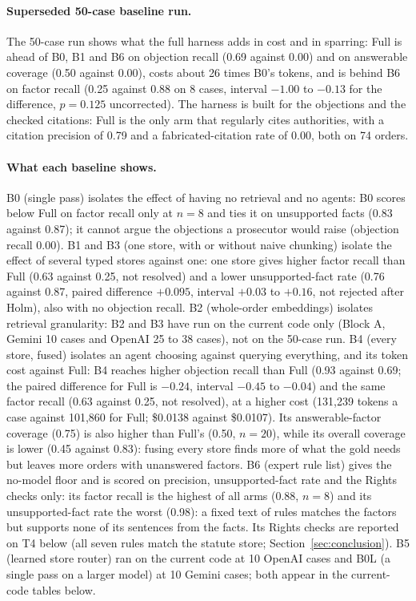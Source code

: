 \paragraph{Superseded 50-case baseline run.} The 50-case run shows what the full harness adds in cost and in sparring: Full is ahead of B0, B1 and B6 on objection recall (0.69 against 0.00) and on answerable coverage (0.50 against 0.00), costs about 26 times B0's tokens, and is behind B6 on factor recall (0.25 against 0.88 on 8 cases, interval $-1.00$ to $-0.13$ for the difference, $p=0.125$ uncorrected). The harness is built for the objections and the checked citations: Full is the only arm that regularly cites authorities, with a citation precision of 0.79 and a fabricated-citation rate of 0.00, both on 74 orders.

\paragraph{What each baseline shows.} B0 (single pass) isolates the effect of having no retrieval and no agents: B0 scores below Full on factor recall only at $n=8$ and ties it on unsupported facts (0.83 against 0.87); it cannot argue the objections a prosecutor would raise (objection recall 0.00). B1 and B3 (one store, with or without naive chunking) isolate the effect of several typed stores against one: one store gives higher factor recall than Full (0.63 against 0.25, not resolved) and a lower unsupported-fact rate (0.76 against 0.87, paired difference $+0.095$, interval $+0.03$ to $+0.16$, not rejected after Holm), also with no objection recall. B2 (whole-order embeddings) isolates retrieval granularity: B2 and B3 have run on the current code only (Block A, Gemini 10 cases and OpenAI 25 to 38 cases), not on the 50-case run. B4 (every store, fused) isolates an agent choosing against querying everything, and its token cost against Full: B4 reaches higher objection recall than Full (0.93 against 0.69; the paired difference for Full is $-0.24$, interval $-0.45$ to $-0.04$) and the same factor recall (0.63 against 0.25, not resolved), at a higher cost (131,239 tokens a case against 101,860 for Full; \$0.0138 against \$0.0107). Its answerable-factor coverage (0.75) is also higher than Full's (0.50, $n=20$), while its overall coverage is lower (0.45 against 0.83): fusing every store finds more of what the gold needs but leaves more orders with unanswered factors. B6 (expert rule list) gives the no-model floor and is scored on precision, unsupported-fact rate and the Rights checks only: its factor recall is the highest of all arms (0.88, $n=8$) and its unsupported-fact rate the worst (0.98): a fixed text of rules matches the factors but supports none of its sentences from the facts. Its Rights checks are reported on T4 below (all seven rules match the statute store; Section~\ref{sec:conclusion}). B5 (learned store router) ran on the current code at 10 OpenAI cases and B0L (a single pass on a larger model) at 10 Gemini cases; both appear in the current-code tables below.


